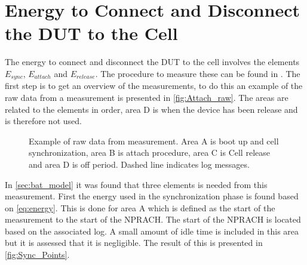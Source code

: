 \section{Energy to Connect and Disconnect the DUT to the Cell} \label{sec:performance_attach}

The energy to connect and disconnect the DUT to the cell involves the elements $E_{sync}$, $E_{attach}$ and $E_{release}$. The procedure to measure these can be found in . The first step is to get an overview of the measurements, to do this an example of the raw data from a measurement is presented in \autoref{fig:Attach_raw}. The areas are related to the elements in order, area D is when the device has been release and is therefore not used.

\begin{figure}[H]
\centering
\begin{minipage}[tbp]{0.58\textwidth}
\resizebox{\textwidth}{!}{
}
\end{minipage}%
\begin{minipage}[tbp]{0.39\textwidth}
\end{minipage}
\caption{Example of raw data from measurement. Area A is boot up and cell synchronization, area B is attach procedure, area C is Cell release and area D is off period. Dashed line indicates log messages.}
\label{fig:Attach_raw}
\end{figure}

In \autoref{sec:bat_model} it was found that three elements is needed from this measurement. First the energy used in the synchronization phase is found based on \autoref{eq:energy}. This is done for area A which is defined as the start of the measurement to the start of the NPRACH. The start of the NPRACH is located based on the associated log. A small amount of idle time is included in this area but it is assessed that it is negligible. The result of this is presented in \autoref{fig:Sync_Points}. 



